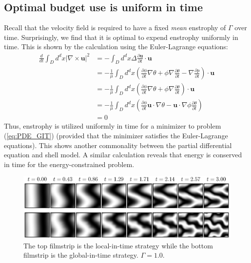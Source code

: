 \subsection{Optimal budget use is uniform in time}
Recall that the velocity field is required to have a fixed {\it mean} enstrophy of $\Gamma$ over time. Surprisingly, we find that it is optimal to expend enstrophy uniformly in time. This is shown by the calculation using the Euler-Lagrange equations:
\begin{align*}
	\frac{d}{dt}\int_{D} d^{d}x | \nabla \times \mathbf{u} |^2 &= -\int_{D} d^{d}x \Delta\frac{\partial\mathbf{u}}{\partial t}\cdot \mathbf{u} \\
	&=- \frac{1}{\mu} \int_{D} d^{d}x \left(\frac{\partial\phi}{\partial t}\nabla \theta +\phi\nabla\frac{\partial\theta}{\partial t}  -\nabla \frac{\partial p}{\partial t} \right)\cdot \mathbf{u} \\
	&=- \frac{1}{\mu} \int_{D} d^{d}x \left(\frac{\partial\phi}{\partial t}\nabla \theta +\phi\nabla\frac{\partial\theta}{\partial t} \right)\cdot \mathbf{u} \\
	&=- \frac{1}{\mu} \int_{D} d^{d}x \left(\frac{\partial\phi}{\partial t}\mathbf{u} \cdot \nabla \theta -\mathbf{u} \cdot \nabla \phi\frac{\partial\theta}{\partial t} \right) \\
	&=0 
\end{align*}
Thus, enstrophy is utilized uniformly in time for a minimizer to problem (\ref{eq:PDE_GIT}) (provided that the minimizer satisfies the Euler-Lagrange equations).  This shows another commonality between the partial differential equation and shell model. A similar calculation reveals that energy is conserved in time for the energy-constrained problem.


\begin{figure}
\centering
\includegraphics[width=\textwidth]{ch-git/images/output_N64_T3p0_gamma_1p0_kappa_0_L1p0/film.eps}
\caption{The top filmstrip is the local-in-time strategy while the bottom filmstrip is the global-in-time strategy. $\Gamma = 1.0$.}
\label{fig:lit_vs_git_film}
\end{figure}

